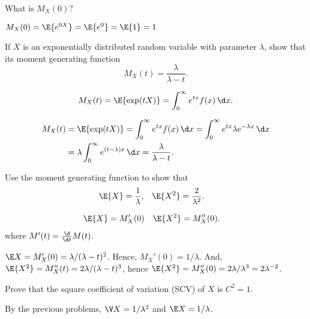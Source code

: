 \begin{exercise}
  What is $M_X(0)?$
  \begin{solution}
    $M_X(0) = \E{e^{0 X}} = \E{e^0} = \E{1} = 1$
  \end{solution}
\end{exercise}

\begin{exercise}\label{ex:33}
 If $X$ is an exponentially distributed random variable with
    parameter $\lambda$, show that its moment generating function
    \begin{equation*}
    M_X(t) = \frac{\lambda}{\lambda-t}.
    \end{equation*}
   \begin{hint}
    \begin{equation*}
      M_X(t) = \E{\exp(t X)} =\int_0^\infty e^{t x} f(x) \,\d x.
\end{equation*}
\end{hint}
    \begin{solution}
    \begin{align*}
      M_X(t) &= \E{\exp(t X)}  
=\int_0^\infty e^{tx} f(x) \,\d x 
=\int_0^\infty e^{tx} \lambda e^{-\lambda x} \,\d x  \\
&=\lambda \int_0^\infty e^{(t-\lambda)x} \,\d x 
=\frac{\lambda}{\lambda -t}.
    \end{align*}
    \end{solution}
  \end{exercise}

\begin{exercise}
    Use the moment generating function to show that 
    \begin{align*}
      \E{X} &=\frac1\lambda, & 
      \E{X^2} &=\frac2{\lambda^2}.
    \end{align*}
\begin{hint}
    \begin{align*}
      \E{X} &= M_X'(0) &  \E{X^2} &= M_X''(0).
    \end{align*}
where $M'(t) = \frac{\d}{\d t} M(t)$. 
\end{hint}
\begin{solution}
  $\E X = M_X'(0)=\lambda/(\lambda-t)^2$. Hence, $M_X'(0)=1/\lambda$. And, $\E{X^2} = M_X''(t)=2\lambda/(\lambda-t)^3$, hence $\E{X^2}=M_X''(0)=2\lambda/\lambda^3=2\lambda^{-2}$. 
\end{solution}
  \end{exercise}

\begin{exercise}
  Prove that the square coefficient of variation (SCV) of $X$ is $C^2 =1$.  
\begin{solution}
  By the previous problems, $\V X = 1/\lambda^2$ and $\E X=1/\lambda$.
\end{solution}
\end{exercise}


